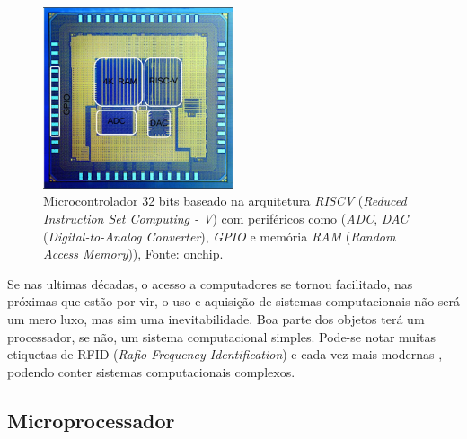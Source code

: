 

\begin{figure}[!htb]
  \centering
  \includegraphics[width=0.5\textwidth]{figuras/riscv.jpg}
    \caption[Microcontrolador na pastilha de silício.]{Microcontrolador 32 bits baseado na arquitetura \textit{RISCV} (\textit{Reduced Instruction Set Computing - V}) com periféricos como (\textit{ADC}, \textit{DAC} (\textit{Digital-to-Analog Converter}), \textit{GPIO} e memória \textit{RAM} (\textit{Random Access Memory})), Fonte: onchip\cite{onchip}.}
  \label{fig:ricv}
\end{figure}


Se nas ultimas décadas, o acesso a computadores se tornou facilitado, nas próximas que estão por vir, o uso e aquisição de sistemas computacionais não será um mero luxo, mas sim uma inevitabilidade\cite{gates1995estrada}. Boa parte dos objetos terá um processador, se não, um sistema computacional simples. Pode-se notar muitas etiquetas de RFID (\textit{Rafio Frequency Identification}) e cada vez mais modernas \cite{ricci2008design}, podendo conter sistemas computacionais complexos.


\subsection{Microprocessador}

